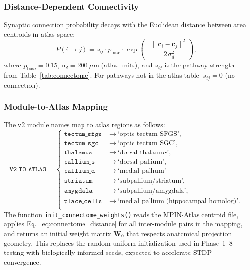 \documentclass[11pt,a4paper]{article}
\begin{document}
\subsubsection{Distance-Dependent Connectivity}

Synaptic connection probability decays with the Euclidean distance
between area centroids in atlas space:
\begin{equation}\label{eq:connectome_distance}
  P(i \to j) = s_{ij} \cdot p_\mathrm{base} \cdot
    \exp\!\left(-\frac{\|\mathbf{c}_i - \mathbf{c}_j\|^2}{2\,\sigma_d^2}\right),
\end{equation}
where $p_\mathrm{base} = 0.15$, $\sigma_d = 200~\mu\text{m}$ (atlas units),
and $s_{ij}$ is the pathway strength from Table~\ref{tab:connectome}.
For pathways not in the atlas table, $s_{ij} = 0$ (no connection).

\subsubsection{Module-to-Atlas Mapping}

The v2 module names map to atlas regions as follows:
\begin{equation*}
\texttt{V2\_TO\_ATLAS} =
\begin{cases}
\texttt{tectum\_sfgs} & \to \text{`optic tectum SFGS'}, \\
\texttt{tectum\_sgc}  & \to \text{`optic tectum SGC'}, \\
\texttt{thalamus}     & \to \text{`dorsal thalamus'}, \\
\texttt{pallium\_s}   & \to \text{`dorsal pallium'}, \\
\texttt{pallium\_d}   & \to \text{`medial pallium'}, \\
\texttt{striatum}     & \to \text{`subpallium/striatum'}, \\
\texttt{amygdala}     & \to \text{`subpallium/amygdala'}, \\
\texttt{place\_cells} & \to \text{`medial pallium (hippocampal homolog)'}. \\
\end{cases}
\end{equation*}
The function \texttt{init\_connectome\_weights()} reads the MPIN-Atlas
centroid file, applies Eq.~\ref{eq:connectome_distance} for all
inter-module pairs in the mapping, and returns an initial weight
matrix $\mathbf{W}_0$ that respects anatomical projection geometry.
This replaces the random uniform initialization used in Phase~1--8
testing with biologically informed seeds, expected to accelerate STDP convergence.
\end{document}

